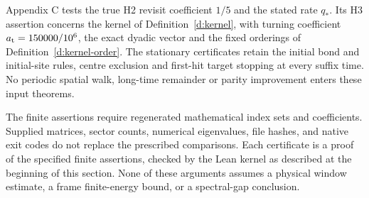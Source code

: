 Appendix C tests the true H2 revisit coefficient \(1/5\) and
the stated rate \(q_*\). Its H3 assertion concerns the kernel of
Definition~\ref{d:kernel}, with turning coefficient
\(a_{\rm t}=150000/10^6\), the exact dyadic vector and the
fixed orderings of Definition~\ref{d:kernel-order}. The stationary
certificates retain the initial bond and initial-site rules,
centre exclusion and first-hit target stopping at every suffix
time. No periodic spatial walk, long-time remainder or parity
improvement enters these input theorems.

The finite assertions require regenerated mathematical index sets
and coefficients. Supplied matrices, sector counts, numerical
eigenvalues, file hashes, and native exit codes do not replace
the prescribed comparisons. Each certificate is a proof of the
specified finite assertions, checked by the Lean kernel as described
at the beginning of this section. None of these arguments assumes
a physical window estimate, a frame finite-energy bound, or a
spectral-gap conclusion.
